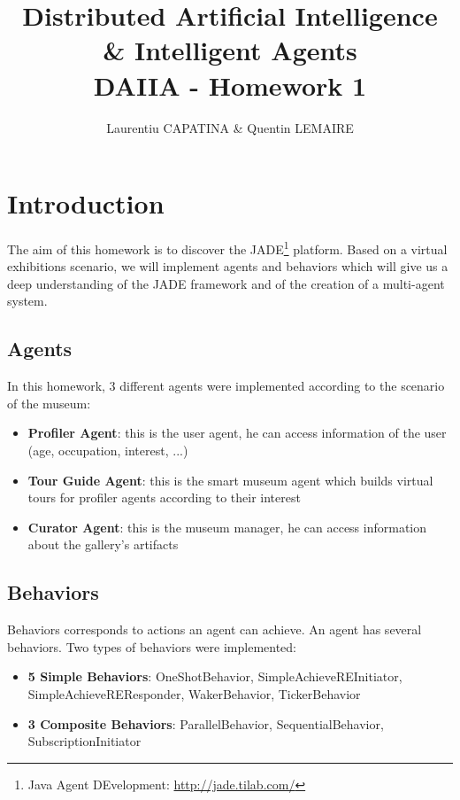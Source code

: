 \documentclass[a4paper,11pt]{article}
\title{Distributed Artificial Intelligence \& Intelligent Agents \\ DAIIA - Homework 1}
\author{Laurentiu CAPATINA \& Quentin LEMAIRE}
\begin{document}
  \maketitle %

  \section{Introduction}
  
  The aim of this homework is to discover the JADE\footnote{Java Agent DEvelopment: \href{http://jade.tilab.com/}{http://jade.tilab.com/}} platform. 
  Based on a virtual exhibitions scenario, we will implement agents and behaviors which will give us a deep understanding of the JADE framework 
  and of the creation of a multi-agent system.
  
  
  \subsection{Agents}
  
  In this homework, 3 different agents were implemented according to the scenario of the museum:
  \begin{itemize}[label=--]
   \item \textbf{Profiler Agent}: this is the user agent, he can access information of the user (age, occupation, interest, ...)
   \item \textbf{Tour Guide Agent}: this is the smart museum agent which builds virtual tours for profiler agents according to their interest
   \item \textbf{Curator Agent}: this is the museum manager, he can access information about the gallery's artifacts
  \end{itemize}

  
  \subsection{Behaviors}
  
  Behaviors corresponds to actions an agent can achieve. An agent has several behaviors. Two types of behaviors were implemented:
  \begin{itemize}[label=--]
   \item \textbf{5 Simple Behaviors}: OneShotBehavior, SimpleAchieveREInitiator, SimpleAchieveREResponder, WakerBehavior, TickerBehavior
   \item \textbf{3 Composite Behaviors}: ParallelBehavior, SequentialBehavior, SubscriptionInitiator
  \end{itemize}
  
\end{document}

